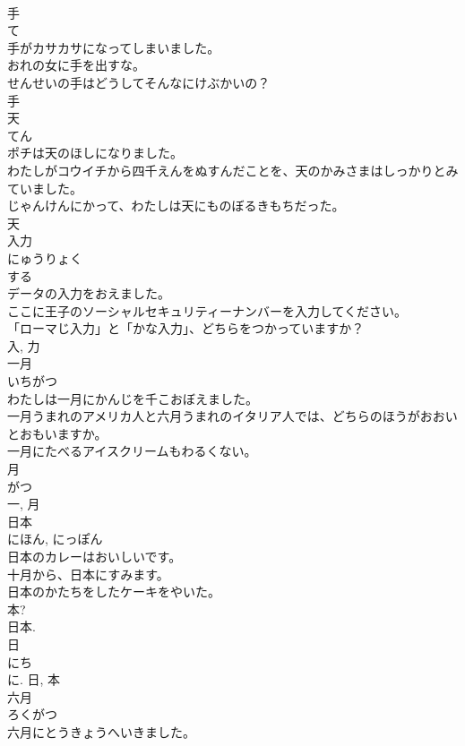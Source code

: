 \documentclass[8pt]{extreport}
\begin{document}
\begin{CJK}{UTF8}{min}
\\	手	
\\	て	
\\	手がカサカサになってしまいました。	
\\	おれの女に手を出すな。	
\\	せんせいの手はどうしてそんなにけぶかいの？	
\\	手	
\\	天	
\\	てん	
\\	ポチは天のほしになりました。	
\\	わたしがコウイチから四千えんをぬすんだことを、天のかみさまはしっかりとみていました。	
\\	じゃんけんにかって、わたしは天にものぼるきもちだった。	
\\	天	
\\	入力	
\\	にゅうりょく	
\\	する 
\\	データの入力をおえました。	
\\	ここに王子のソーシャルセキュリティーナンバーを入力してください。	
\\	「ローマじ入力」と「かな入力」、どちらをつかっていますか？	
\\	入, 力	
\\	一月	
\\	いちがつ	
\\	わたしは一月にかんじを千こおぼえました。	
\\	一月うまれのアメリカ人と六月うまれのイタリア人では、どちらのほうがおおいとおもいますか。	
\\	一月にたべるアイスクリームもわるくない。	
\\	月 
\\	がつ 
\\	一, 月	
\\	日本	
\\	にほん, にっぽん	
\\	日本のカレーはおいしいです。	
\\	十月から、日本にすみます。	
\\	日本のかたちをしたケーキをやいた。	
\\	本? 
\\	日本.
\\	日 
\\	にち 
\\	に.	日, 本	
\\	六月	
\\	ろくがつ	
\\	六月にとうきょうへいきました。	

\end{CJK}
\end{document}
